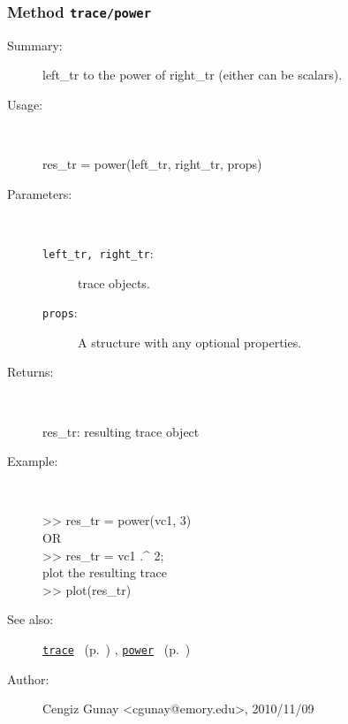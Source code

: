 \subsubsection[Method \texttt{power}]{Method \texttt{trace/power}}%
%
\label{ref_trace__power}%
\hypertarget{ref_trace__power}{}%
\begin{description}
\item[Summary:]left\_tr to the power of right\_tr (either can be scalars).
%
\item[Usage:]~%
\begin{lyxcode}%
res\_tr = power(left\_tr, right\_tr, props)
%
\end{lyxcode}%
%
%
\item[Parameters:]~
\begin{description}%
\item[\texttt{left\_tr, right\_tr}:]
 trace objects.
\item[\texttt{props}:]
 A structure with any optional properties.
\end{description}%
%
\item[Returns:
]~

   res\_tr: resulting trace object
%
\item[Example:]~
\begin{lyxcode} >> res\_tr = power(vc1, 3)
\\%
 OR
\\%
 >> res\_tr = vc1 .\textasciicircum{} 2;
\\%
 plot the resulting trace
\\%
 >> plot(res\_tr)
\\%
\end{lyxcode}
%
\item[See also:]%
\hyperlink{ref_trace}{\texttt{trace}}%
\ (p.~\pageref{ref_trace})%
%
, \hyperlink{ref_power}{\texttt{power}}%
\ (p.~\pageref{ref_power})%
%
%
\item[Author:]%
Cengiz Gunay <cgunay@emory.edu>, 2010/11/09
%
\end{description}
\methodline%
